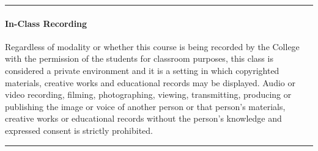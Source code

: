 \documentclass[
  letterpaper,
  DIV=11,
  numbers=noendperiod]{scrartcl}
\let\oldparagraph\paragraph
\renewcommand{\paragraph}[1]{\oldparagraph{#1}\mbox{}}
\begin{document}
\begin{center}\rule{0.5\linewidth}{0.5pt}\end{center}

\hypertarget{in-class-recording}{%
\paragraph{In-Class Recording}\label{in-class-recording}}

Regardless of modality or whether this course is being recorded by the
College with the permission of the students for classroom purposes, this
class is considered a private environment and it is a setting in which
copyrighted materials, creative works and educational records may be
displayed. Audio or video recording, filming, photographing, viewing,
transmitting, producing or publishing the image or voice of another
person or that person's materials, creative works or educational records
without the person's knowledge and expressed consent is strictly
prohibited.~

\begin{center}\rule{0.5\linewidth}{0.5pt}\end{center}
\end{document}
